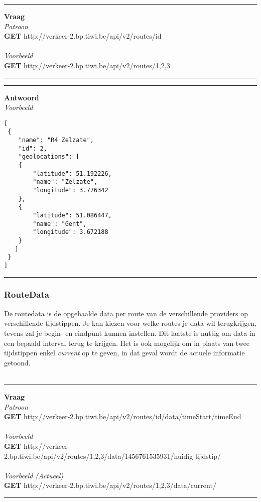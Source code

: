 \documentclass[ps,a4paper,oneside]{report}
\begin{document}
\noindent\rule[0.5ex]{\linewidth}{1pt}
\textbf{Vraag}\\
\textit{Patroon}\\
\textbf{GET} http://verkeer-2.bp.tiwi.be/api/v2/routes/id\\\\
\textit{Voorbeeld}\\
\textbf{GET} http://verkeer-2.bp.tiwi.be/api/v2/routes/1,2,3\\
\noindent\rule[0.5ex]{\linewidth}{1pt}

\noindent\rule[0.5ex]{\linewidth}{1pt}
\textbf{Antwoord}\\
\textit{Voorbeeld}
\begin{verbatim}[
 {
    "name": "R4 Zelzate",
    "id": 2,
    "geolocations": [
    {
        "latitude": 51.192226,
        "name": "Zelzate",
        "longitude": 3.776342
    },
    {
        "latitude": 51.086447,
        "name": "Gent",
        "longitude": 3.672188
    }
   ]
 }
]\end{verbatim}
\noindent\rule[0.5ex]{\linewidth}{1pt}
\subsubsection{RouteData}
De routedata is de opgehaalde data per route van de verschillende providers op verschillende tijdstippen. Je kan kiezen voor welke routes je data wil terugkrijgen, tevens zal je begin- en eindpunt kunnen instellen. Dit laatste is nuttig om data in een bepaald interval terug te krijgen. Het is ook mogelijk om in plaats van twee tijdstippen enkel \textit{current} op te geven, in dat geval wordt de actuele informatie getoond.\\\\ 


\noindent\rule[0.5ex]{\linewidth}{1pt}
\textbf{Vraag}\\
\textit{Patroon}\\
\textbf{GET} http://verkeer-2.bp.tiwi.be/api/v2/routes/id/data/timeStart/timeEnd\\\\
\textit{Voorbeeld}\\
\textbf{GET} http://verkeer-2.bp.tiwi.be/api/v2/routes/1,2,3/data/1456761535931/huidig tijdstip/\\\\
\textit{Voorbeeld (Actueel)}\\
\textbf{GET} http://verkeer-2.bp.tiwi.be/api/v2/routes/1,2,3/data/current/\\
\noindent\rule[0.5ex]{\linewidth}{1pt}
\end{document}
